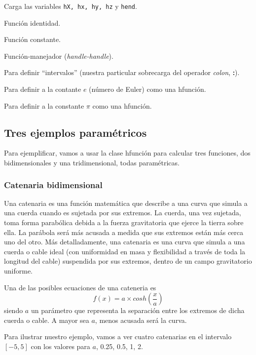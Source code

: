 \documentclass{article}
\begin{document}
\begin{description}[font=\normalfont\ttfamily]
\item[loadPack] Carga las variables \texttt{hX, hx, hy, hz} y
  \texttt{hend}.
\item[hv] Función identidad.
\item[hc] Función constante.
\item[hh] Función-manejador (\textit{handle-handle}).
\item[hc] Para definir ``intervalos'' (nuestra particular sobrecarga del
  operador \textit{colon}, \textbf{:}).
\item[he] Para definir a la contante $e$ (número de Euler) como una hfunción.
\item[pi] Para definir a la constante $\pi$ como una hfunción.
\end{description}

\subsection{Tres ejemplos paramétricos}
\label{ssec:samples}
Para ejemplificar, vamos a usar la clase hfunción para calcular tres
funciones, dos bidimensionales y una tridimensional, todas
paramétricas.

\subsubsection{Catenaria bidimensional}
Una catenaria es una función matemática que describe a una curva que simula a una
cuerda cuando es sujetada por sus extremos. La cuerda, una vez
sujetada, toma forma parabólica debida a la fuerza gravitatoria que
ejerce la tierra sobre ella. La parábola será más acusada a medida que
sus extremos están más cerca uno del otro. Más detalladamente, una
catenaria es una curva que simula a una cuerda o cable ideal
(con uniformidad en masa y flexibilidad a través de toda la longitud
del cable) suspendida por sus extremos, dentro de un campo gravitatorio
uniforme.

Una de las posibles ecuaciones de una cateneria es \[ f(x) =
a \times cosh\left(\frac{x}{a}\right) \] siendo $a$ un parámetro que representa la
separación entre los extremos de dicha cuerda o cable. A mayor sea
$a$, menos acusada será la curva.

Para ilustrar nuestro ejemplo, vamos a ver cuatro catenarias en el
intervalo $[-5, 5]$ con los valores para $a$, 0.25, 0.5, 1, 2.
\end{document}
